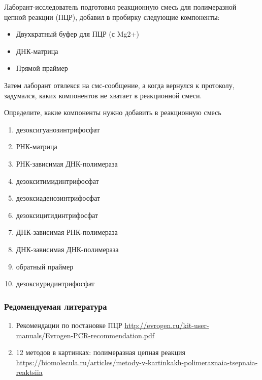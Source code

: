 
Лаборант-исследователь подготовил реакционную смесь для полимеразной цепной реакции (ПЦР), добавил в пробирку следующие компоненты: 

\begin{itemize}
    \item Двухкратный буфер для ПЦР (с Mg2+)
    \item ДНК-матрица
    \item Прямой праймер
\end{itemize}

Затем лаборант отвлекся на смс-сообщение, а когда вернулся к протоколу, задумался, каких компонентов не хватает в реакционной смеси.

Определите, какие компоненты нужно добавить в реакционную смесь

\begin{enumerate}
    \item дезоксигуанозинтрифосфат
    \item РНК-матрица
    \item РНК-зависимая ДНК-полимераза
    \item дезокситимидинтрифосфат
    \item дезоксиаденозинтрифосфат
    \item дезоксицитидинтрифосфат
    \item ДНК-зависимая РНК-полимераза
    \item ДНК-зависимая ДНК-полимераза
    \item обратный праймер
    \item дезоксиуридинтрифосфат
\end{enumerate}

\subsubsection*{Редомендуемая литература}

\begin{enumerate}
    \item Рекомендации по постановке ПЦР \url{http://evrogen.ru/kit-user-manuals/Evrogen-PCR-recommendation.pdf}
    \item 12 методов в картинках: полимеразная цепная реакция \url{https://biomolecula.ru/articles/metody-v-kartinkakh-polimeraznaia-tsepnaia-reaktsiia}
\end{enumerate}